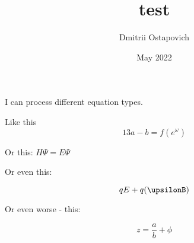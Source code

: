 \documentclass{article}
\title{test}
\author{Dmitrii Ostapovich}
\date{May 2022}
\begin{document}
\maketitle

I can process different equation types.

Like this
$$13a - b = f(e^\omega)$$

Or this: $H\Psi = E\Psi$

Or even this:

\begin{equation}
    qE+q(\upsilonB)
\end{equation}

Or even worse - this:

\begin{equation}
    z = \frac{a}{b} + \phi
\end{equation}
\end{document}

